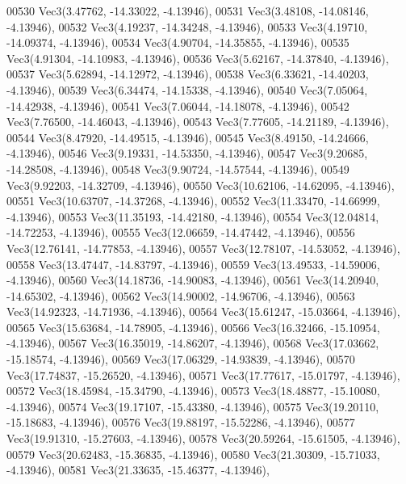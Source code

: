\begin{DoxyCode}
00530         Vec3(3.47762, -14.33022, -4.13946),
00531         Vec3(3.48108, -14.08146, -4.13946),
00532         Vec3(4.19237, -14.34248, -4.13946),
00533         Vec3(4.19710, -14.09374, -4.13946),
00534         Vec3(4.90704, -14.35855, -4.13946),
00535         Vec3(4.91304, -14.10983, -4.13946),
00536         Vec3(5.62167, -14.37840, -4.13946),
00537         Vec3(5.62894, -14.12972, -4.13946),
00538         Vec3(6.33621, -14.40203, -4.13946),
00539         Vec3(6.34474, -14.15338, -4.13946),
00540         Vec3(7.05064, -14.42938, -4.13946),
00541         Vec3(7.06044, -14.18078, -4.13946),
00542         Vec3(7.76500, -14.46043, -4.13946),
00543         Vec3(7.77605, -14.21189, -4.13946),
00544         Vec3(8.47920, -14.49515, -4.13946),
00545         Vec3(8.49150, -14.24666, -4.13946),
00546         Vec3(9.19331, -14.53350, -4.13946),
00547         Vec3(9.20685, -14.28508, -4.13946),
00548         Vec3(9.90724, -14.57544, -4.13946),
00549         Vec3(9.92203, -14.32709, -4.13946),
00550         Vec3(10.62106, -14.62095, -4.13946),
00551         Vec3(10.63707, -14.37268, -4.13946),
00552         Vec3(11.33470, -14.66999, -4.13946),
00553         Vec3(11.35193, -14.42180, -4.13946),
00554         Vec3(12.04814, -14.72253, -4.13946),
00555         Vec3(12.06659, -14.47442, -4.13946),
00556         Vec3(12.76141, -14.77853, -4.13946),
00557         Vec3(12.78107, -14.53052, -4.13946),
00558         Vec3(13.47447, -14.83797, -4.13946),
00559         Vec3(13.49533, -14.59006, -4.13946),
00560         Vec3(14.18736, -14.90083, -4.13946),
00561         Vec3(14.20940, -14.65302, -4.13946),
00562         Vec3(14.90002, -14.96706, -4.13946),
00563         Vec3(14.92323, -14.71936, -4.13946),
00564         Vec3(15.61247, -15.03664, -4.13946),
00565         Vec3(15.63684, -14.78905, -4.13946),
00566         Vec3(16.32466, -15.10954, -4.13946),
00567         Vec3(16.35019, -14.86207, -4.13946),
00568         Vec3(17.03662, -15.18574, -4.13946),
00569         Vec3(17.06329, -14.93839, -4.13946),
00570         Vec3(17.74837, -15.26520, -4.13946),
00571         Vec3(17.77617, -15.01797, -4.13946),
00572         Vec3(18.45984, -15.34790, -4.13946),
00573         Vec3(18.48877, -15.10080, -4.13946),
00574         Vec3(19.17107, -15.43380, -4.13946),
00575         Vec3(19.20110, -15.18683, -4.13946),
00576         Vec3(19.88197, -15.52286, -4.13946),
00577         Vec3(19.91310, -15.27603, -4.13946),
00578         Vec3(20.59264, -15.61505, -4.13946),
00579         Vec3(20.62483, -15.36835, -4.13946),
00580         Vec3(21.30309, -15.71033, -4.13946),
00581         Vec3(21.33635, -15.46377, -4.13946),

\end{DoxyCode}
